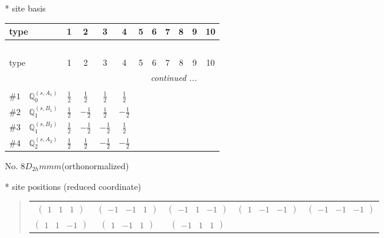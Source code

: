 \documentclass[fleqn,9pt,landscape]{jsarticle}
\begin{document}
* site basis
\begin{center}
\renewcommand{\arraystretch}{1.3}
\begin{longtable}{lcccccccccc}
 \hline \hline
type & 1 & 2 & 3 & 4 & 5 & 6 & 7 & 8 & 9 & 10 \\ \hline \endfirsthead

\multicolumn{10}{l}{\tablename\ \thetable{}} \\
 \hline \hline
type & 1 & 2 & 3 & 4 & 5 & 6 & 7 & 8 & 9 & 10 \\ \hline \endhead

 \hline \hline
\multicolumn{10}{r}{\footnotesize\it continued ...} \\ \endfoot

 \hline \hline
\multicolumn{10}{r}{} \\ \endlastfoot

$ \#1\quad \mathbb{Q}_{0}^{(s,A_{1})} $ & $ \frac{1}{2} $ & $ \frac{1}{2} $ & $ \frac{1}{2} $ & $ \frac{1}{2} $ \\ \hline
$ \#2\quad \mathbb{Q}_{1}^{(s,B_{1})} $ & $ \frac{1}{2} $ & $ - \frac{1}{2} $ & $ \frac{1}{2} $ & $ - \frac{1}{2} $ \\ \hline
$ \#3\quad \mathbb{Q}_{1}^{(s,B_{2})} $ & $ \frac{1}{2} $ & $ - \frac{1}{2} $ & $ - \frac{1}{2} $ & $ \frac{1}{2} $ \\ \hline
$ \#4\quad \mathbb{Q}_{2}^{(s,A_{2})} $ & $ \frac{1}{2} $ & $ \frac{1}{2} $ & $ - \frac{1}{2} $ & $ - \frac{1}{2} $ \\
\end{longtable}
\end{center}
\newpage
\begin{center}
\LARGE
No. 8\quad$D_{2h}$\quad$mmm$\quad[ orthorhombic ] (orthonormalized)
\end{center}
\vspace{5mm}
* site positions (reduced coordinate)
\begin{quote}
\begin{tabular}{ccccc}
$ \begin{pmatrix} 1 & 1 & 1 \end{pmatrix} $ & $ \begin{pmatrix} -1 & -1 & 1 \end{pmatrix} $ & $ \begin{pmatrix} -1 & 1 & -1 \end{pmatrix} $ & $ \begin{pmatrix} 1 & -1 & -1 \end{pmatrix} $ & $ \begin{pmatrix} -1 & -1 & -1 \end{pmatrix} $ \\
$ \begin{pmatrix} 1 & 1 & -1 \end{pmatrix} $ & $ \begin{pmatrix} 1 & -1 & 1 \end{pmatrix} $ & $ \begin{pmatrix} -1 & 1 & 1 \end{pmatrix} $ & $  $ & $  $
\end{tabular}
\end{quote}
\end{document}
